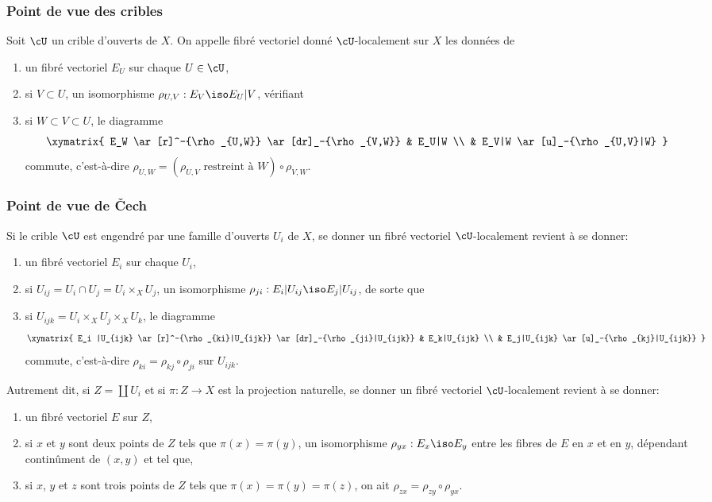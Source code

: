 \subsubsection{Point de vue des cribles}\label{I:1-3-1}

Soit $\cU$ un crible d'ouverts de $X$. On appelle fibré vectoriel donné 
$\cU$-localement sur $X$ les données de 
\begin{enumerate}[\indent a)]
  \item {}un fibré vectoriel $E_U$ sur chaque $U\in \cU$, 
  \item si $V\subset U$, un isomorphisme $\rho_{U,V} : E_V\iso E_U|V$, vérifiant 
  \item si $W\subset V\subset U$, le diagramme 
    \[\xymatrix{
      E_W \ar[r]^-{\rho_{U,W}} \ar[dr]_-{\rho_{V,W}}
        & E_U|W \\
      & E_V|W \ar[u]_-{\rho_{U,V}|W}
    }\]
    commute, c'est-à-dire 
    $\rho_{U,W} = (\mbox{$\rho_{U,V}$ restreint à $W$}) \circ \rho_{V,W}$. 
\end{enumerate}





\subsubsection{Point de vue de Čech}\label{I:1-3-2}

Si le crible $\cU$ est engendré par une famille d'ouverts $U_i$ de $X$, se 
donner un fibré vectoriel $\cU$-localement revient à se donner:
\begin{enumerate}[\indent a)]
  \item un fibré vectoriel $E_i$ sur chaque $U_i$, 
  \item si $U_{ij} = U_i\cap U_j = U_i\times_X U_j$, un isomorphisme 
    $\rho_{ji} : E_i|U_{ij} \iso E_j|U_{ij}$, de sorte que 
  \item si $U_{ijk} = U_i\times_X U_j\times_X U_k$, le diagramme 
    \[\xymatrix{
      E_i |U_{ijk} \ar[r]^-{\rho_{ki}|U_{ijk}} \ar[dr]_-{\rho_{ji}|U_{ijk}} 
        & E_k|U_{ijk} \\
      & E_j|U_{ijk} \ar[u]_-{\rho_{kj}|U_{ijk}}
    }\]
    commute, c'est-à-dire $\rho_{ki} = \rho_{kj}\circ \rho_{ji}$ sur 
    $U_{ijk}$. 
\end{enumerate}

Autrement dit, si $Z=\coprod U_i$ et si $\pi:Z\to X$ est la projection 
naturelle, se donner un fibré vectoriel $\cU$-localement revient à se donner: 
\begin{enumerate}[\indent a)]
  \item un fibré vectoriel $E$ sur $Z$, 
  \item si $x$ et $y$ sont deux points de $Z$ tels que $\pi(x) = \pi(y)$, un 
    isomorphisme $\rho_{y x}:E_x\iso E_y$ entre les fibres de $E$ en $x$ et en 
    $y$, dépendant continûment de $(x,y)$ et tel que, 
  \item si $x$, $y$ et $z$ sont trois points de $Z$ tels que 
  $\pi(x)=\pi(y)=\pi(z)$, on ait $\rho_{zx} = \rho_{zy}\circ \rho_{yx}$. 
\end{enumerate}





